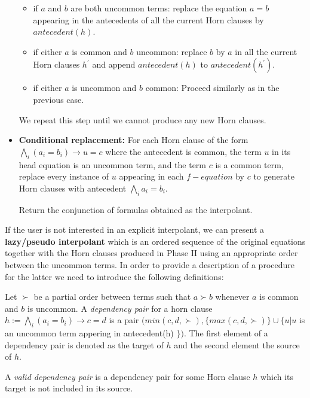 \begin{itemize}
    \begin{itemize}
      \item if $a$ and $b$ are both uncommon terms:
        replace the equation $a = b$ appearing in the antecedents
        of all the current Horn clauses by $antecedent(h)$.
      \item if either $a$ is common and $b$ uncommon: replace $b$ by $a$
        in all the current Horn clauses $h^{'}$ and append $antecedent(h)$ to 
        $antecedent(h^{'})$.
      \item if either $a$ is uncommon and $b$ common: Proceed similarly as in the
        previous case.
    \end{itemize}

    We repeat this step until we cannot produce any new Horn clauses. 

  \item \textbf{Conditional replacement:} 
    For each Horn clause of the form $\bigwedge_i(a_i = b_i) 
    \rightarrow u = c$ 
    where the antecedent is common, the term $u$ in its 
    head equation is an uncommon term,
    and the term $c$ is a common term, 
    replace every instance of $u$ appearing in each 
    $f-equation$ by $c$ to generate Horn clauses with 
    antecedent $\bigwedge_i a_i = b_i$.

    Return the conjunction of formulas obtained 
    as the interpolant.
\end{itemize}

If the user is not interested in an explicit interpolant, 
we can present a \textbf{lazy/pseudo interpolant}
which is an ordered sequence of the original equations 
together with the Horn clauses produced in Phase II 
using an appropriate order between the uncommon terms. In order to
provide a description of a procedure for the latter we need
to introduce the following definitions:

\begin{definition}\label{dep_pair}
  Let $\succ$ be a partial order between terms 
  such that $a \succ b$ whenever 
  $a$ is common and $b$ is uncommon. A \emph{dependency pair}
  for a horn clause $h := \bigwedge_i (a_i = b_i) \rightarrow c = d$
  is a pair $(min(c, d, \succ), \{max(c, d, \succ)\} \cup \{ u | u$ 
  is an uncommon term appering in antecedent(h) $\})$.
  The first element of a dependency pair is denoted as the
  target of $h$ and the second element the source of $h$.

  A \emph{valid dependency pair} is a dependency pair for some
  Horn clause $h$ which its target is not included in its
  source.
\end{definition}

